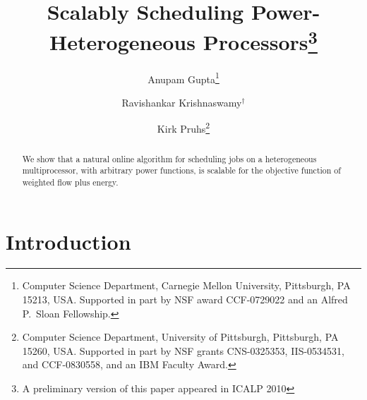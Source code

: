 \documentclass[11pt]{article}
\begin{document}
\title{Scalably Scheduling Power-Heterogeneous Processors\footnote{A preliminary version of this paper appeared in ICALP 2010}}

\author{
 Anupam Gupta\thanks{ Computer Science Department, Carnegie Mellon
    University, Pittsburgh, PA 15213, USA. 
Supported in part by
     NSF award CCF-0729022 and an Alfred P.~Sloan
     Fellowship.}
 \and Ravishankar Krishnaswamy$^\dagger$
\and Kirk Pruhs\thanks{Computer Science Department,
University of Pittsburgh, Pittsburgh, PA 15260, USA. 
Supported in part by
 NSF grants CNS-0325353, IIS-0534531, and CCF-0830558, and
 an IBM Faculty Award.}
 }

\date{}
\maketitle


\begin{abstract}
  We show that a natural online algorithm for scheduling jobs on a
  heterogeneous multiprocessor, with arbitrary power functions, is
  scalable for the objective function of weighted flow plus energy.
\end{abstract}

\section{Introduction}
\label{sec:introduction}
\end{document}
